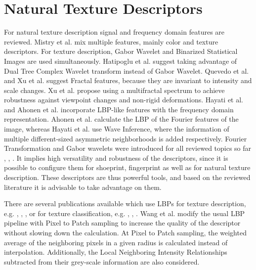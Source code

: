 \documentclass[draft,final]{vutinfth} %
\begin{document}
\section*{Natural Texture Descriptors}
\par
For natural texture description signal and frequency domain features are reviewed.
Mistry et al. \cite{mistry2017content}  mix multiple features, mainly color and texture descriptors.
For texture description, Gabor Wavelet and Binarized Statistical Images  \cite{kannala2012bsif} are used simultaneously.
Hatipoglu et al. \cite{hatipoglu2000image} suggest taking advantage of Dual Tree Complex Wavelet transform instead of Gabor Wavelet.
Quevedo et al. \cite{quevedo2002description} and Xu et al. \cite{xu2009viewpoint} suggest Fractal features, because they are invariant to intensity and scale changes.
Xu et al. \cite{xu2009viewpoint} propose using a multifractal spectrum to achieve robustness against viewpoint changes and non-rigid deformations.
Hayati et al. \cite{hayati2018wirif} and Ahonen et al. \cite{ahonen2009rotation} incorporate LBP-like features with the frequency domain representation.
Ahonen et al. \cite{ahonen2009rotation} calculate the LBP of the Fourier features of the image, whereas Hayati et al. \cite{hayati2018wirif} use Wave Inference, where the information of multiple different-sized asymmetric neighborhoods is added respectively.
Fourier Transformation and Gabor wavelets were introduced for all reviewed topics so far \cite{kortylewski2014unsupervised}, \cite{wu2019crime}, \cite{bolle2012fingerprint}.
It implies high versatility and robustness of the descriptors, since it is possible to configure them for shoeprint, fingerprint as well as for natural texture description.  
These descriptors are thus powerful tools, and based on the reviewed literature it is advisable to take advantage on them.
\par
There are several publications available which use LBPs for texture description, e.g. \cite{guo2012discriminative}, \cite{hong2014combining}, \cite{ahonen2009rotation}, or for texture classification, e.g. \cite{khellah2011texture}, \cite{guo2010rotation}, \cite{zhang2017learning}.
Wang et al. \cite{wang2013pixel} modify the usual LBP pipeline with Pixel to Patch sampling to increase the quality of the descriptor without slowing down the calculation.
At Pixel to Patch sampling, the weighted average of the neighboring pixels in a given radius is calculated instead of interpolation.
Additionally, the Local Neighboring Intensity Relationships subtracted from their grey-scale information are also considered.
\end{document}
